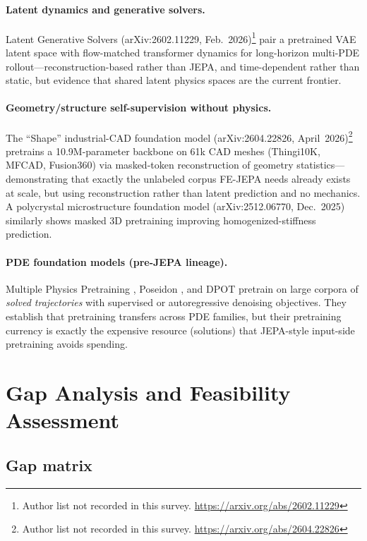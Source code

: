 \documentclass[11pt]{article}
\begin{document}
\paragraph{Latent dynamics and generative solvers.}
Latent Generative Solvers (arXiv:2602.11229, Feb.~2026)\footnote{Author list
not recorded in this survey. \url{https://arxiv.org/abs/2602.11229}} pair a
pretrained VAE latent space with flow-matched transformer dynamics for
long-horizon multi-PDE rollout---reconstruction-based rather than JEPA, and
time-dependent rather than static, but evidence that shared latent physics
spaces are the current frontier.

\paragraph{Geometry/structure self-supervision without physics.}
The ``Shape'' industrial-CAD foundation model (arXiv:2604.22826,
April~2026)\footnote{Author list not recorded in this survey.
\url{https://arxiv.org/abs/2604.22826}} pretrains a 10.9M-parameter backbone
on 61k CAD meshes (Thingi10K, MFCAD, Fusion360) via masked-token
reconstruction of geometry statistics---demonstrating that exactly the
unlabeled corpus FE-JEPA needs already exists at scale, but using
reconstruction rather than latent prediction and no mechanics. A polycrystal
microstructure foundation model (arXiv:2512.06770, Dec.~2025) similarly shows
masked 3D pretraining improving homogenized-stiffness prediction.

\paragraph{PDE foundation models (pre-JEPA lineage).}
Multiple Physics Pretraining \cite{mccabe2023mpp}, Poseidon
\cite{herde2024poseidon}, and DPOT \cite{hao2024dpot} pretrain on large
corpora of \emph{solved trajectories} with supervised or autoregressive
denoising objectives. They establish that pretraining transfers across PDE
families, but their pretraining currency is exactly the expensive resource
(solutions) that JEPA-style input-side pretraining avoids spending.

\section{Gap Analysis and Feasibility Assessment}
\label{sec:gap}

\subsection{Gap matrix}
\end{document}
